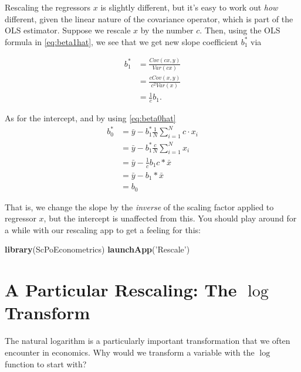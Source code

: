 \documentclass[]{book}
\newenvironment{Shaded}{\begin{snugshade}}{\end{snugshade}}
\newcommand{\KeywordTok}[1]{\textcolor[rgb]{0.13,0.29,0.53}{\textbf{#1}}}
\newcommand{\NormalTok}[1]{#1}
\newcommand{\StringTok}[1]{\textcolor[rgb]{0.31,0.60,0.02}{#1}}
\begin{document}
Rescaling the regressors \(x\) is slightly different, but it's easy to work out \emph{how} different, given the linear nature of the covariance operator, which is part of the OLS estimator. Suppose we rescale \(x\) by the number \(c\). Then, using the OLS formula in \eqref{eq:beta1hat}, we see that we get new slope coefficient \(b_1^*\) via

\begin{align} 
b_1^* &= \frac{Cov(cx,y)}{Var(cx)} \\ 
      &= \frac{cCov(x,y)}{c^2 Var(x)} \\
      &= \frac{1}{c} b_1.
\end{align}

As for the intercept, and by using \eqref{eq:beta0hat}
\begin{align} 
b_0^* &= \bar{y} -             b_1^* \frac{1}{N}\sum_{i=1}^N c \cdot x_i \\ 
      &= \bar{y} -             b_1^* \frac{c}{N}\sum_{i=1}^N x_i  \\
      &= \bar{y} - \frac{1}{c} b_1 c * \bar{x}  \\
      &= \bar{y} -  b_1 * \bar{x}  \\
      &= b_0
\end{align}

That is, we change the slope by the \emph{inverse} of the scaling factor applied to regressor \(x\), but the intercept is unaffected from this. You should play around for a while with our rescaling app to get a feeling for this:

\begin{Shaded}
\begin{Highlighting}[]
\KeywordTok{library}\NormalTok{(ScPoEconometrics)}
\KeywordTok{launchApp}\NormalTok{(}\StringTok{'Rescale'}\NormalTok{)}
\end{Highlighting}
\end{Shaded}

\hypertarget{a-particular-rescaling-the-log-transform}{%
\section{\texorpdfstring{A Particular Rescaling: The \(\log\) Transform}{A Particular Rescaling: The \textbackslash{}log Transform}}\label{a-particular-rescaling-the-log-transform}}

The natural logarithm is a particularly important transformation that we often encounter in economics. Why would we transform a variable with the \(\log\) function to start with?
\end{document}
